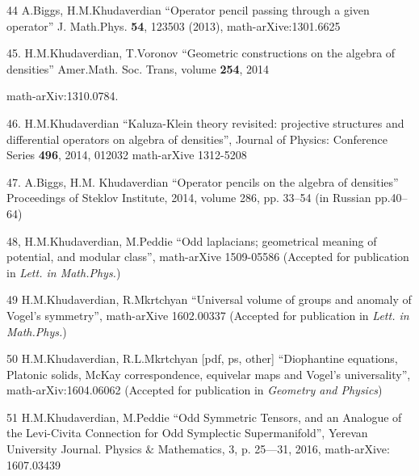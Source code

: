 \documentclass[12pt]{article}
\def\m {\medskip}
\begin{document}
\m
 
44 A.Biggs, H.M.Khudaverdian
``Operator pencil passing through a given operator'' 
 J. Math.Phys. {\bf 54}, 123503 (2013), math-arXive:1301.6625 

\m

45.  H.M.Khudaverdian, T.Voronov
``Geometric constructions on the algebra of densities'' 
Amer.Math. Soc. Trans, volume {\bf 254}, 2014

math-arXiv:1310.0784. 
 
\m

46. H.M.Khudaverdian ``Kaluza-Klein theory revisited: 
   projective structures and 
differential operators on algebra of densities'',
Journal of Physics: Conference Series {\bf 496}, 2014,
 012032
   math-arXive  1312-5208 


\m 


     47. A.Biggs, H.M. Khudaverdian 
``Operator pencils on the algebra of densities''
 Proceedings of Steklov Institute, 2014, volume 286, pp. 33--54
  (in Russian pp.40--64)      

\m

48, H.M.Khudaverdian, M.Peddie  ``Odd laplacians; geometrical meaning
   of potential, and modular class'',
      math-arXive  1509-05586 
(Accepted for publication in {\it Lett. in Math.Phys.})
\m

49  H.M.Khudaverdian, R.Mkrtchyan  ``Universal volume of groups 
   and anomaly of Vogel's symmetry'',
      math-arXive 1602.00337
(Accepted for publication in {\it Lett. in Math.Phys.})
\m


 

 50  
H.M.Khudaverdian, R.L.Mkrtchyan
 [pdf, ps, other]
``Diophantine equations, Platonic solids, McKay correspondence, 
equivelar maps and Vogel's universality'', math-arXiv:1604.06062 
(Accepted for publication in {\it Geometry and Physics})
\m

51 H.M.Khudaverdian, M.Peddie 
 ``Odd Symmetric Tensors, and an Analogue of the Levi-Civita 
Connection for Odd Symplectic Supermanifold'',
   Yerevan University Journal. Physics $\&$ Mathematics,
3, p. 25---31, 2016, math-arXive: 1607.03439 


 
\end{document}

